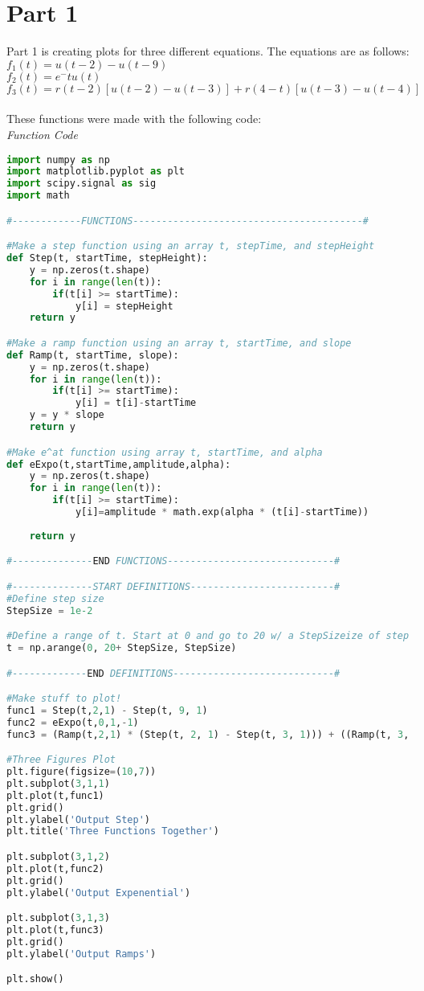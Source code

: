 \documentclass[12pt,a4paper]{article}
\begin{document}
\section{Part 1}\label{sec:intro}
Part 1 is creating plots for three different equations. The equations are as follows:\\
$f_1 (t) = u(t −2) −u(t −9)$\\
$f_2 (t) = e^-t u(t)$\\
$f_3 (t) = r(t −2) [u(t −2) −u(t −3)] + r(4 −t) [u(t −3) −u(t −4)]$\\
\\
These functions were made with the following code:
\\
\textit{Function Code}
\begin{lstlisting}[language=Python]
import numpy as np
import matplotlib.pyplot as plt
import scipy.signal as sig
import math

#------------FUNCTIONS----------------------------------------#

#Make a step function using an array t, stepTime, and stepHeight
def Step(t, startTime, stepHeight):
    y = np.zeros(t.shape)
    for i in range(len(t)):
        if(t[i] >= startTime):
            y[i] = stepHeight
    return y

#Make a ramp function using an array t, startTime, and slope
def Ramp(t, startTime, slope):
    y = np.zeros(t.shape)
    for i in range(len(t)):
        if(t[i] >= startTime):
            y[i] = t[i]-startTime
    y = y * slope
    return y

#Make e^at function using array t, startTime, and alpha
def eExpo(t,startTime,amplitude,alpha):
    y = np.zeros(t.shape)
    for i in range(len(t)):
        if(t[i] >= startTime):
            y[i]=amplitude * math.exp(alpha * (t[i]-startTime))
    
    return y

#--------------END FUNCTIONS-----------------------------#

#--------------START DEFINITIONS-------------------------#
#Define step size
StepSize = 1e-2

#Define a range of t. Start at 0 and go to 20 w/ a StepSizeize of step
t = np.arange(0, 20+ StepSize, StepSize)

#-------------END DEFINITIONS----------------------------#

#Make stuff to plot!
func1 = Step(t,2,1) - Step(t, 9, 1)
func2 = eExpo(t,0,1,-1)
func3 = (Ramp(t,2,1) * (Step(t, 2, 1) - Step(t, 3, 1))) + ((Ramp(t, 3, -1) + 1) * (Step(t, 3, 1) - Step(t, 4, 1)) ) #x * y

#Three Figures Plot
plt.figure(figsize=(10,7))
plt.subplot(3,1,1)
plt.plot(t,func1)
plt.grid()
plt.ylabel('Output Step')
plt.title('Three Functions Together')

plt.subplot(3,1,2)
plt.plot(t,func2)
plt.grid()
plt.ylabel('Output Expenential')

plt.subplot(3,1,3)
plt.plot(t,func3)
plt.grid()
plt.ylabel('Output Ramps')

plt.show()
\end{lstlisting}
\end{document}
